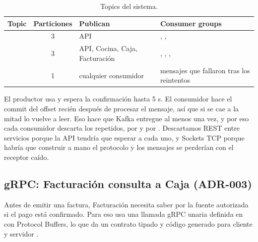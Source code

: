 \begin{table}[H]
\centering
\small
\begin{tabularx}{\textwidth}{@{}l c l Y@{}}
\toprule
\textbf{Topic} & \textbf{Particiones} & \textbf{Publican} & \textbf{Consumer groups} \\
\midrule
{} & 3 & API & , ,  \\
 & 3 & API, Cocina, Caja, Facturación & , , ,  \\
 & 1 & cualquier consumidor & mensajes que fallaron tras los reintentos \\
\bottomrule
\end{tabularx}
\caption{Topics del sistema.}
\label{tab:topics}
\end{table}

El productor usa  y espera la confirmación hasta 5 s. El consumidor hace el commit del offset recién después de procesar el mensaje, así que si se cae a la mitad lo vuelve a leer. Eso hace que Kafka entregue al menos una vez, y por eso cada consumidor descarta los repetidos,  por  y  por . Descartamos REST entre servicios porque la API tendría que esperar a cada uno, y Sockets TCP porque habría que construir a mano el protocolo y los mensajes se perderían con el receptor caído.

\subsection{gRPC: Facturación consulta a Caja (ADR-003)}

Antes de emitir una factura, Facturación necesita saber por la fuente autorizada si el pago está confirmado. Para eso usa una llamada gRPC unaria definida en  con Protocol Buffers, lo que da un contrato tipado y código generado para cliente y servidor \parencite{grpc2024documentation}.

